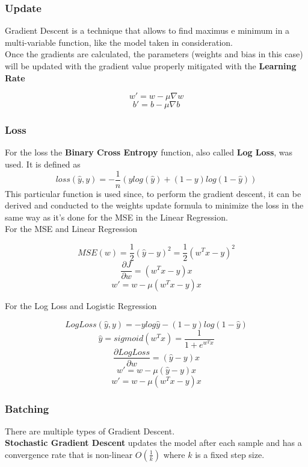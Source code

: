 \documentclass[
	letterpaper, %
	10pt, %
]{class}
\begin{document}
\subsubsection{Update}

Gradient Descent \cite{sgd} is a technique that allows to find maximus e minimum in a multi-variable function, like the model taken in consideration.\\
Once the gradients are calculated, the parameters (weights and bias in this case) will be updated with the gradient value properly mitigated with the \textbf{Learning Rate}

$$ w' = w - \mu \nabla w $$
$$ b' = b - \mu \nabla b $$

\subsubsection{Loss}
For the loss the \textbf{Binary Cross Entropy} \cite{binarycrossentropy} function, also called \textbf{Log Loss}, was used.
It is defined as
$$ loss(\hat{y}, y) = -\frac{1}{n}(y log(\hat{y}) + (1-y)log(1-\hat{y})) $$
This particular function is used since, to perform the gradient descent, it can be derived and conducted to the weights update formula to minimize the loss in the same way as it's done for the MSE \cite{mse} in the Linear Regression.\\

For the MSE and Linear Regression

$$ MSE(w) = \frac{1}{2} (\hat{y} - y)^2 = \frac{1}{2} (w^Tx - y)^2 $$
$$\frac{\partial J}{\partial w} = (w^T x - y)x $$
$$ w' = w - \mu (w^T x -y)x $$

For the Log Loss and Logistic Regression

$$ LogLoss(\hat{y}, y) = -y log \hat{y} - (1-y)log(1- \hat{y})$$
$$ \hat{y} = sigmoid(w^Tx) = \frac{1}{1 + e^{w^Tx}} $$
$$ \frac{\partial LogLoss}{\partial w} = (\hat{y} - y)x $$
$$ w' = w - \mu (\hat{y} - y)x $$
$$ w' = w - \mu (w^T x -y)x $$

\subsubsection{Batching}
There are multiple types of Gradient Descent.\\

\textbf{Stochastic Gradient Descent} updates the model after each sample and has a convergence rate that is non-linear $O(\frac{1}{k})$ where $k$ is a fixed step size.\\
\end{document}
